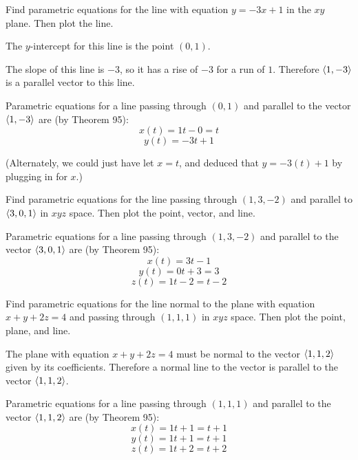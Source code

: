 \documentclass[letterpaper, twoside, 12pt]{book}
\begin{document}
          \begin{problem}
            Find parametric equations for the line with equation $y=-3x+1$
            in the $xy$ plane. Then plot the line.
          \end{problem}

          \begin{solution}
  The $y$-intercept for this line is the point $(0,1)$.

  The slope of this line is $-3$, so it has a rise of $-3$ for a run of $1$.
  Therefore $\langle1,-3\rangle$ is a parallel vector to this line.

  Parametric equations for a line passing through $(0,1)$ and parallel
  to the vector $\langle1,-3\rangle$ are (by Theorem 95):
  \[
    x(t) = 1t - 0 = t
  \]
  \[
    y(t) = -3t + 1
  \]

  (Alternately, we could just have let $x=t$, and deduced that
  $y=-3(t)+1$ by plugging in for $x$.)
          \end{solution}

          \begin{problem}
            Find parametric equations for the line passing through $(1,3,-2)$
            and parallel to $\langle3,0,1\rangle$ in $xyz$ space. Then plot the point,
            vector, and line.
          \end{problem}

          \begin{solution}
  Parametric equations for a line passing through $(1,3,-2)$ and parallel
  to the vector $\langle3,0,1\rangle$ are (by Theorem 95):
  \[
    x(t) = 3t - 1
  \]
  \[
    y(t) = 0t + 3 = 3
  \]
  \[
    z(t) = 1t - 2 = t - 2
  \]
          \end{solution}

          \begin{problem}
            Find parametric equations for the line normal to the plane with
            equation $x+y+2z=4$ and passing through $(1,1,1)$ in $xyz$ space.
            Then plot the point, plane, and line.
          \end{problem}

          \begin{solution}
  The plane with equation $x+y+2z=4$ must be normal to the vector $\langle1,1,2\rangle$
  given by its coefficients. Therefore a normal line to the vector is
  parallel to the vector $\langle1,1,2\rangle$.

  Parametric equations for a line passing through $(1,1,1)$ and parallel
  to the vector $\langle1,1,2\rangle$ are (by Theorem 95):
  \[
    x(t) = 1t + 1 = t + 1
  \]
  \[
    y(t) = 1t + 1 = t + 1
  \]
  \[
    z(t) = 1t + 2 = t + 2
  \]
          \end{solution}
\end{document}
